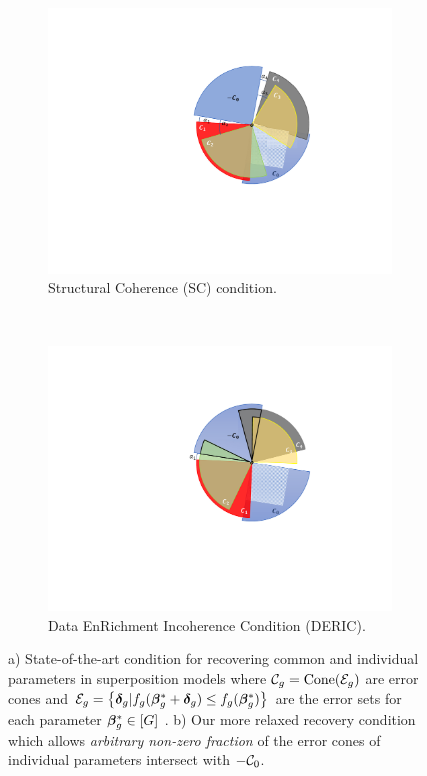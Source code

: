 \begin{figure}[t!]
	\centering
	\begin{subfigure}[t]{0.43\textwidth}
		\includegraphics[width=\textwidth]{./img/sc.pdf}
		\caption{Structural Coherence (SC) condition.}\label{fig:sc}
	\end{subfigure} 
	~
	\begin{subfigure}[t]{0.43\textwidth}
		\includegraphics[width=\textwidth]{./img/deric.pdf}
		\caption{Data EnRichment Incoherence Condition (DERIC).}
		\label{fig:deric}
	\end{subfigure}
	\squeezeup
	\caption{a) State-of-the-art condition for recovering common and individual parameters in superposition models where $\cC_g = \text{Cone}(\cE_g)$ are error cones and $\cE_g = \left\{\ddelta_g | f_g(\bbeta _g^* + \ddelta_g) \leq f_g(\bbeta _g^*)\right\}$ are the error sets for each parameter $\boldsymbol{\beta}^*_g \in [G]$ \cite{guba16}. b) Our more relaxed recovery condition which allows \emph{arbitrary non-zero fraction } of the error cones of individual parameters intersect with $-\cC_0$.}
	\label{fig syn2}
\end{figure}


